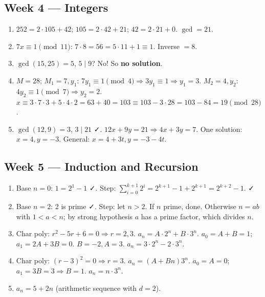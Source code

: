 \documentclass[11pt]{article}
\newcommand{\divides}{\mid}
\begin{document}
\subsection*{Week 4 — Integers}
\begin{enumerate}[nosep,label=\arabic*.]
  \item $252=2\cdot105+42$; $105=2\cdot42+21$; $42=2\cdot21+0$. $\gcd=21$.
  \item $7x\equiv1\pmod{11}$: $7\cdot8=56=5\cdot11+1\equiv1$. Inverse $=8$.
  \item $\gcd(15,25)=5$, $5\divides9$? No! So \textbf{no solution}.
  \item $M=28$; $M_1=7,y_1$: $7y_1\equiv1\pmod4\Rightarrow 3y_1\equiv1\Rightarrow y_1=3$. $M_2=4,y_2$: $4y_2\equiv1\pmod7\Rightarrow y_2=2$. $x\equiv3\cdot7\cdot3+5\cdot4\cdot2=63+40=103\equiv103-3\cdot28=103-84=19\pmod{28}$.
  \item $\gcd(12,9)=3$, $3\divides21$ ✓. $12x+9y=21\Rightarrow4x+3y=7$. One solution: $x=4,y=-3$. General: $x=4+3t,y=-3-4t$.
\end{enumerate}

\subsection*{Week 5 — Induction and Recursion}
\begin{enumerate}[nosep,label=\arabic*.]
  \item Base $n=0$: $1=2^1-1$ ✓. Step: $\sum_{i=0}^{k+1}2^i=2^{k+1}-1+2^{k+1}=2^{k+2}-1$. ✓
  \item Base $n=2$: 2 is prime ✓. Step: let $n>2$. If $n$ prime, done. Otherwise $n=ab$ with $1<a<n$; by strong hypothesis $a$ has a prime factor, which divides $n$.
  \item Char poly: $r^2-5r+6=0\Rightarrow r=2,3$. $a_n=A\cdot2^n+B\cdot3^n$. $a_0=A+B=1$; $a_1=2A+3B=0$. $B=-2,A=3$. $a_n=3\cdot2^n-2\cdot3^n$.
  \item Char poly: $(r-3)^2=0\Rightarrow r=3$. $a_n=(A+Bn)3^n$. $a_0=A=0$; $a_1=3B=3\Rightarrow B=1$. $a_n=n\cdot3^n$.
  \item $a_n=5+2n$ (arithmetic sequence with $d=2$).
\end{enumerate}
\end{document}

